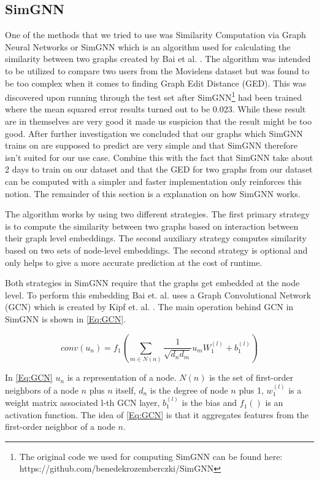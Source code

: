\subsection{SimGNN}\label{AP:SimGNN}
One of the methods that we tried to use was Similarity Computation via Graph Neural Networks or SimGNN which is an algorithm used for calculating the similarity between two graphs created by Bai et al. \cite{Bai2018}. The algorithm was intended to be utilized to compare two users from the Movielens dataset but was found to be too complex when it comes to finding Graph Edit Distance (GED). This was discovered upon running through the test set after SimGNN\footnote{The original code we used for computing SimGNN can be found here: https://github.com/benedekrozemberczki/SimGNN} had been trained where the mean squared error results turned out to be 0.023. While these result are in themselves are very good it made us suspicion that the result might be too good. After further investigation we concluded that our graphs which SimGNN trains on are supposed to predict are very simple and that SimGNN therefore isn't suited for our use case. Combine this with the fact that SimGNN take about 2 days to train on our dataset and that the GED for two graphs from our dataset can be computed with a simpler and faster implementation only reinforces this notion. The remainder of this section is a explanation on how SimGNN works.




The algorithm works by using two different strategies. The first primary strategy is to compute the similarity between two graphs based on interaction between their graph level embeddings. The second auxiliary strategy computes similarity based on two sets of node-level embeddings. The second strategy is optional and only helps to give a more accurate prediction at the cost of runtime\cite{Bai2018}.

Both strategies in SimGNN require that the graphs get embedded at the node level. To perform this embedding Bai et. al. uses a Graph Convolutional Network (GCN)\cite{Bai2018} which is created by Kipf et. al. \cite{Kipf2016}. The main operation behind GCN in SimGNN is shown in \autoref{Eq:GCN}.


\begin{equation}\label{Eq:GCN}
conv(u_n)=f_1(\sum_{m \in N(n)} \frac{1}{\sqrt{d_nd_m}}u_mW_1^{(l)}+b_1^{(l)})
\end{equation}

In \autoref{Eq:GCN} $u_n$ is a representation of a node. $N(n)$ is the set of first-order neighbors of a node $n$ plus $n$ itself, $d_n$ is the degree of node $n$ plus 1, $w_1^{(l)}$ is a weight matrix associated l-th GCN layer, $b_1^{(l)}$ is the bias and $f_1()$ is an activation function. The idea of \autoref{Eq:GCN} is that it aggregates features from the first-order neighbor of a node $n$\cite{Bai2018}.

